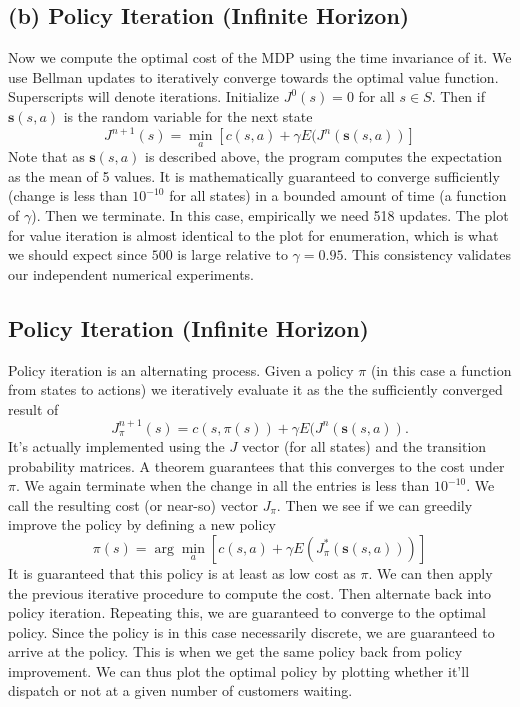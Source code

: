 \documentclass{article}
\begin{document}
\subsection{(b) Policy Iteration (Infinite Horizon)}
Now we compute the optimal cost of the MDP using the time invariance of it.
We use Bellman updates to iteratively converge towards the optimal value function. Superscripts will denote iterations. Initialize $J^0(s)=0$ for all $s\in S$. Then if $\boldsymbol{s}(s,a)$ is the random variable for the next state
\[ J^{n+1}(s) = \min_a \left[ c(s,a) + \gamma E(J^n (\boldsymbol{s}(s,a)) \right] \]
Note that as $\boldsymbol{s}(s,a)$ is described above, the program computes the expectation as the mean of 5 values.
It is mathematically guaranteed to converge sufficiently (change is less than $10^{-10}$ for all states) in a bounded amount of time (a function of $\gamma$). Then we terminate. In this case, empirically we need 518 updates. 
The plot for value iteration is almost identical to the plot for enumeration, which is what we should expect since $500$ is large relative to $\gamma = 0.95$. This consistency validates our independent numerical experiments.

\subsection{Policy Iteration (Infinite Horizon)}
Policy iteration is an alternating process. Given a policy $\pi$ (in this case a function from states to actions) we iteratively evaluate it
as the the sufficiently converged result of
\[ J^{n+1}_{\pi}(s) = c(s,\pi(s)) + \gamma E(J^n (\boldsymbol{s}(s,a)). \]
It's actually implemented using the $J$ vector (for all states) and the transition probability matrices. A theorem guarantees that this converges to the cost under $\pi$. We again terminate when the change in all the entries is less than $10^{-10}$. We call the resulting cost (or near-so) vector $J_\pi$.
Then we see if we can greedily improve the policy by defining a new policy 
\[ \pi(s) = \arg \min_a   \left[ c(s,a) + \gamma E(J^*_\pi (\boldsymbol{s}(s,a)))\right]\]
It is guaranteed that this policy is at least as low cost as $\pi$. 
We can then apply the previous iterative procedure to compute the cost. Then alternate back into policy iteration. Repeating this, we are guaranteed to converge to the optimal policy. Since the policy is in this case necessarily discrete, we are guaranteed to arrive at the policy. This is when we get the same policy back from policy improvement.
We can thus plot the optimal policy by plotting whether it'll dispatch or not at a given number of customers waiting.
\end{document}

